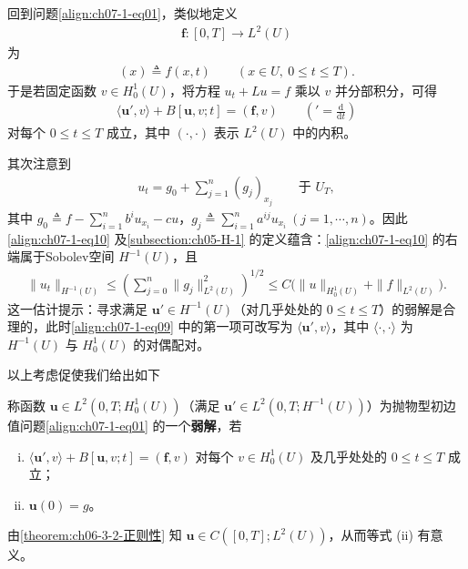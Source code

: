 \documentclass[../../main.tex]{subfiles}
\begin{document}
回到问题\eqref{align:ch07-1-eq01}，类似地定义
\begin{align*}
\mathbf{f}:[0,T]\to L^2(U)
\end{align*}
为
\begin{align*}
[\mathbf{f}(t)](x)\triangleq f(x,t)\qquad (x\in U,\ 0\leqslant t\leqslant T).
\end{align*}
于是若固定函数 $v\in H^1_0(U)$，将方程 $u_t+Lu=f$ 乘以 $v$ 并分部积分，可得
\begin{align}
\langle \mathbf{u}',v\rangle + B[\mathbf{u},v;t] = (\mathbf{f},v)\qquad \left('=\frac{\mathrm{d}}{\mathrm{d}t}\right)\label{align:ch07-1-eq09}
\end{align}
对每个 $0\leqslant t\leqslant T$ 成立，其中 $(\cdot,\cdot)$ 表示 $L^2(U)$ 中的内积。

其次注意到
\begin{align}
u_t = g_0 + \sum_{j=1}^n (g_j)_{x_j}\qquad \text{于 } U_T,\label{align:ch07-1-eq10}
\end{align}
其中 $g_0\triangleq f-\sum_{i=1}^n b^i u_{x_i}-cu$，$g_j\triangleq\sum_{i=1}^n a^{ij}u_{x_i}\ (j=1,\cdots,n)$。因此\eqref{align:ch07-1-eq10} 及\cref{subsection:ch05-H-1} 的定义蕴含：\eqref{align:ch07-1-eq10} 的右端属于Sobolev空间 $H^{-1}(U)$，且
\begin{align*}
\|u_t\|_{H^{-1}(U)} \leqslant \left(\sum_{j=0}^n \|g_j\|_{L^2(U)}^2\right)^{1/2} \leqslant C\bigl(\|u\|_{H^1_0(U)}+\|f\|_{L^2(U)}\bigr).
\end{align*}
这一估计提示：寻求满足 $\mathbf{u}'\in H^{-1}(U)$（对几乎处处的 $0\leqslant t\leqslant T$）的弱解是合理的，此时\eqref{align:ch07-1-eq09} 中的第一项可改写为 $\langle\mathbf{u}',v\rangle$，其中 $\langle\cdot,\cdot\rangle$ 为 $H^{-1}(U)$ 与 $H^1_0(U)$ 的对偶配对。

以上考虑促使我们给出如下

\begin{definition}\label{definition:ch07-1-抛物弱解}
称函数 $\mathbf{u}\in L^2(0,T;H^1_0(U))$（满足 $\mathbf{u}'\in L^2(0,T;H^{-1}(U))$）为抛物型初边值问题\eqref{align:ch07-1-eq01} 的一个\textbf{弱解}，若
\begin{enumerate}[(i)]
\item $\langle\mathbf{u}',v\rangle + B[\mathbf{u},v;t] = (\mathbf{f},v)$ 对每个 $v\in H^1_0(U)$ 及几乎处处的 $0\leqslant t\leqslant T$ 成立；
\item $\mathbf{u}(0)=g$。
\end{enumerate}
\end{definition}

\begin{remark}\label{remark:ch07-1-弱解初值合理}
由\cref{theorem:ch06-3-2-正则性} 知 $\mathbf{u}\in C([0,T];L^2(U))$，从而等式 (ii) 有意义。
\end{remark}
\end{document}
